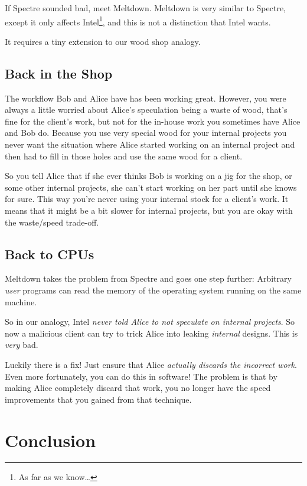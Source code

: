 \documentclass{article}
\begin{document}
If Spectre sounded bad, meet Meltdown. Meltdown is very similar to Spectre,
except it only affects Intel\footnote{As far as we know\dots}, and this is not a
distinction that Intel wants.

It requires a tiny extension to our wood shop analogy.

\subsection*{Back in the Shop}

The workflow Bob and Alice have has been working great. However, you were
always a little worried about Alice's speculation being a waste of wood, that's
fine for the client's work, but not for the in-house work you sometimes have
Alice and Bob do. Because you use very special wood for your internal projects
you never want the situation where Alice started working on an internal project
and then had to fill in those holes and use the same wood for a client.

So you tell Alice that if she ever thinks Bob is working on a jig for the shop,
or some other internal projects, she can't start working on her part until she
knows for sure. This way you're never using your internal stock for a client's
work. It means that it might be a bit slower for internal projects, but you are
okay with the waste/speed trade-off.

\subsection*{Back to CPUs}

Meltdown takes the problem from Spectre and goes one step further: Arbitrary
\emph{user} programs can read the memory of {the operating system} running on
the same machine.

So in our analogy, Intel \emph{never told Alice to not speculate on internal
projects}. So now a malicious client can try to trick Alice into leaking
\emph{internal} designs. This is \emph{very} bad.

Luckily there is a fix! Just ensure that Alice \emph{actually discards the
incorrect work}. Even more fortunately, you can do this in software! The
problem is that by making Alice completely discard that work, you no longer
have the speed improvements that you gained from that technique.

\section{Conclusion}
\end{document}
